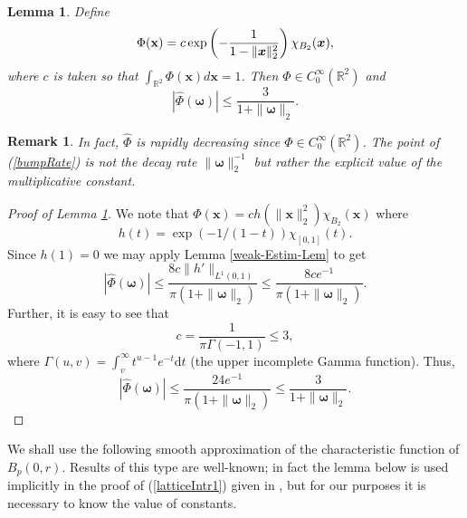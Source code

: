 \documentclass{amsart}
\newtheorem{lem}[theorem]{Lemma}
\newtheorem{rem}[theorem]{Remark}
\numberwithin{equation}{section}
\begin{document}
\begin{lem}
\label{bumpLemma}
Define
\begin{equation}
\label{bump}
\Phi({\bf x})=c\exp\left(-\frac{1}{1-\|\boldsymbol{x}\|_2^2}\right)\chi_{B_2}(\boldsymbol{x}),
\end{equation}
where $c$ is taken so that $\int_{\mathbb{R}^2}\Phi(\boldsymbol{x})d\boldsymbol{x}=1$.
Then $\Phi\in C_0^\infty(\mathbb{R}^2)$ and
\begin{equation}
\label{bumpRate}
|\widehat{\Phi}(\boldsymbol{\omega})|\le\frac{3}{1+\|\boldsymbol{\omega}\|_2}.
\end{equation}
\end{lem}
\begin{rem}
In fact, $\widehat{\Phi}$ is rapidly decreasing since $\Phi\in C_0^\infty(\mathbb{R}^2)$. The point of (\ref{bumpRate}) is not the decay rate $\|\boldsymbol{\omega}\|_2^{-1}$ but rather the explicit value of the multiplicative constant.
\end{rem}
\begin{proof}[Proof of Lemma \ref{bumpLemma}]
We note that $\Phi(\boldsymbol{x})=ch(\|\boldsymbol{x}\|_2^2)\chi_{B_2}(\boldsymbol{x})$ where 
$$
h(t)=\exp(-1/(1-t))\chi_{[0,1]}(t).
$$
Since $h(1)=0$ we may apply Lemma \ref{weak-Estim-Lem} to get
\begin{equation}
\nonumber
|\widehat{\Phi}(\boldsymbol{\omega})|\le \frac{8c\|h'\|_{L^1(0,1)}}{\pi(1+\|\boldsymbol{\omega}\|_2)}\le\frac{8ce^{-1}}{\pi(1+\|\boldsymbol{\omega}\|_2)}.
\end{equation}
Further, it is easy to see that
\begin{equation}
    \nonumber
    c=\frac{1}{\pi\Gamma(-1,1)}\le3,
\end{equation}
where $\displaystyle\Gamma(u,v)=\int_v^\infty t^{u-1}e^{-t}\mathrm{d}t$ (the upper incomplete Gamma function). Thus,
\begin{equation}
    \nonumber
    |\widehat{\Phi}(\boldsymbol{\omega})|\le\frac{24e^{-1}}{\pi(1+\|\boldsymbol{\omega}\|_2)}\le\frac{3}{1+\|\boldsymbol{\omega}\|_2}.
\end{equation}   
\end{proof}
We shall use the following smooth approximation of the characteristic function of $B_p(0,r)$. Results of this type are well-known; in fact the lemma below is used implicitly in the proof of (\ref{latticeIntr1}) given in \cite[Theorem 8.2]{SteinShak}, but for our purposes it is necessary to know the value of constants.
\end{document}
